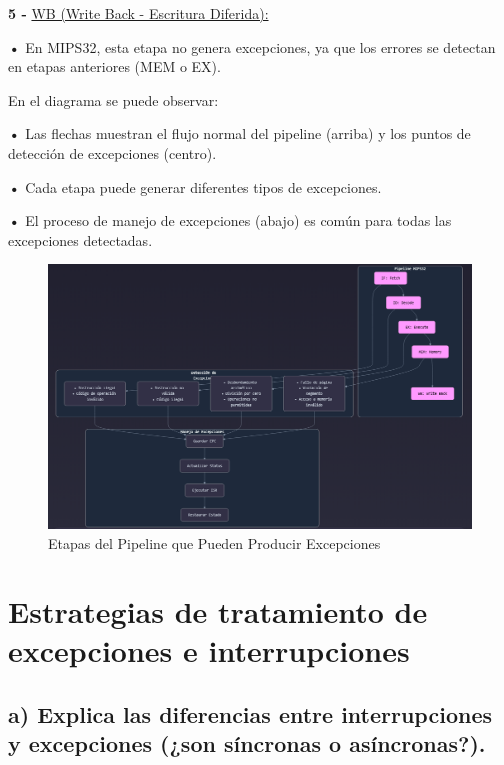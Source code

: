 \documentclass{article}
\begin{document}
\quad

\textbf{5 -  } {\underline{WB (Write Back - Escritura Diferida): }}

\quad

\textbf{    •} { En MIPS32, esta etapa no genera excepciones, ya que los errores se detectan en etapas anteriores (MEM o EX).}

\quad

{En el diagrama se puede observar:}

\quad

\textbf{    •} { Las flechas muestran el flujo normal del pipeline (arriba) y los puntos de detección de excepciones (centro).}

\textbf{    •} { Cada etapa puede generar diferentes tipos de excepciones.}

\textbf{    •} { El proceso de manejo de excepciones (abajo) es común para todas las excepciones detectadas.}

\quad


\begin{figure}[h]
    \centering
    \includegraphics[width=10cm\textwidth]{figura_05_(practica04).png}
    \caption{Etapas del Pipeline que Pueden Producir Excepciones}
    \label{fig:img1}
\end{figure}


\quad
\newpage
\quad
\newpage







\section{Estrategias de tratamiento de excepciones e interrupciones}

\subsection*{a) Explica las diferencias entre interrupciones y excepciones (¿son síncronas o asíncronas?).}
\end{document}
